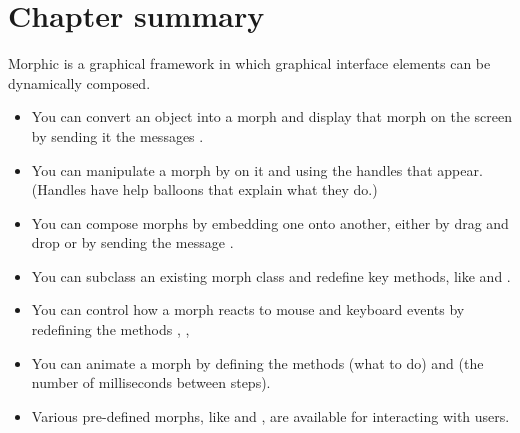 \documentclass[a4paper,10pt,twoside]{book}
\begin{document}




\section{Chapter summary}

Morphic is a graphical framework in which graphical interface elements can be dynamically composed.

\begin{itemize}
  \item You can convert an object into a morph and display that morph on the screen by sending it the messages .
  \item You can manipulate a morph by  on it and using the handles that appear. (Handles have help balloons that explain what they do.)
  \item You can compose morphs by embedding one onto another, either by drag and drop or by sending the message .
  \item You can subclass an existing morph class and redefine key methods, like  and .
  \item You can control how a morph reacts to mouse and keyboard events by redefining the methods , , \etc
  \item You can animate a morph by defining the methods  (what to do) and  (the number of milliseconds between steps).
  \item Various pre-defined morphs, like  and , are available for interacting with users.
\end{itemize}

\ifx\wholebook\relax\else
\end{document}
